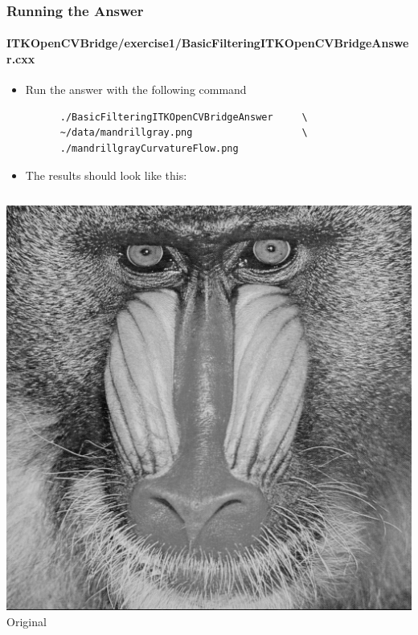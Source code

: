 \begin{frame}[fragile]
\frametitle{Running the Answer}
\framesubtitle{ITKOpenCVBridge/exercise1/BasicFilteringITKOpenCVBridgeAnswer.cxx}
\begin{itemize}
\item Run the answer with the following command
\begin{verbatim}
      ./BasicFilteringITKOpenCVBridgeAnswer     \
      ~/data/mandrillgray.png                   \
      ./mandrillgrayCurvatureFlow.png 
\end{verbatim}
\end{itemize}
\end{frame}

\begin{frame}
\begin{itemize}
\frametitle{Exercise 1: Answer}
\framesubtitle{ITKOpenCVBridge/exercise1/BasicFilteringITKOpenCVBridgeAnswer.cxx}
\item The results should look like this:
\end{itemize}
\begin{columns}[c]
\begin{center}
\includegraphics[width=1\textwidth]{../Art/mandrilgray.png} \\
Original
\end{center}

\end{columns}
\end{frame}
